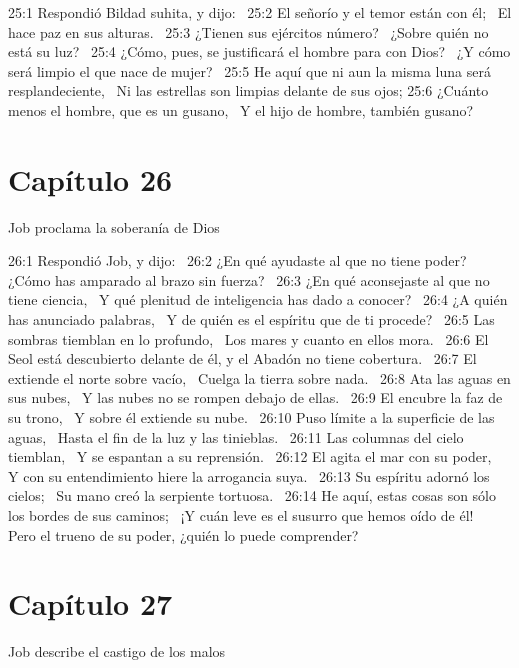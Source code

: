 25:1 Respondió Bildad suhita, y dijo:  
25:2 El señorío y el temor están con él;  
El hace paz en sus alturas.  
25:3 ¿Tienen sus ejércitos número?  
¿Sobre quién no está su luz?  
25:4 ¿Cómo, pues, se justificará el hombre para con Dios?  
¿Y cómo será limpio el que nace de mujer?  
25:5 He aquí que ni aun la misma luna será resplandeciente,  
Ni las estrellas son limpias delante de sus ojos; 
25:6 ¿Cuánto menos el hombre, que es un gusano,  
Y el hijo de hombre, también gusano?  
\section*{Capítulo 26 }
Job proclama la soberanía de Dios  

26:1 Respondió Job, y dijo:  
26:2 ¿En qué ayudaste al que no tiene poder?  
¿Cómo has amparado al brazo sin fuerza?  
26:3 ¿En qué aconsejaste al que no tiene ciencia,  
Y qué plenitud de inteligencia has dado a conocer?  
26:4 ¿A quién has anunciado palabras,  
Y de quién es el espíritu que de ti procede?  
26:5 Las sombras tiemblan en lo profundo,  
Los mares y cuanto en ellos mora.  
26:6 El Seol está descubierto delante de él, y el Abadón no tiene cobertura.  
26:7 El extiende el norte sobre vacío,  
Cuelga la tierra sobre nada.  
26:8 Ata las aguas en sus nubes,  
Y las nubes no se rompen debajo de ellas.  
26:9 El encubre la faz de su trono,  
Y sobre él extiende su nube.  
26:10 Puso límite a la superficie de las aguas,  
Hasta el fin de la luz y las tinieblas.  
26:11 Las columnas del cielo tiemblan,  
Y se espantan a su reprensión.  
26:12 El agita el mar con su poder,  
Y con su entendimiento hiere la arrogancia suya.  
26:13 Su espíritu adornó los cielos;  
Su mano creó la serpiente tortuosa.  
26:14 He aquí, estas cosas son sólo los bordes de sus caminos;  
¡Y cuán leve es el susurro que hemos oído de él!  
Pero el trueno de su poder, ¿quién lo puede comprender?  
\section*{Capítulo 27 }
Job describe el castigo de los malos  

